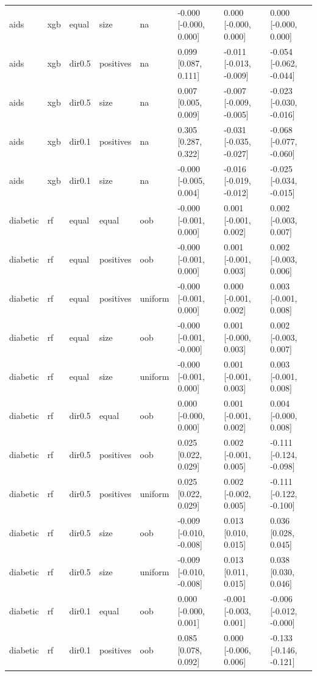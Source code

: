 \begin{tabular}{llllllll}
aids & xgb & equal & size & na & -0.000 [-0.000, 0.000] & 0.000 [-0.000, 0.000] & 0.000 [-0.000, 0.000] \\
aids & xgb & dir0.5 & positives & na & 0.099 [0.087, 0.111] & -0.011 [-0.013, -0.009] & -0.054 [-0.062, -0.044] \\
aids & xgb & dir0.5 & size & na & 0.007 [0.005, 0.009] & -0.007 [-0.009, -0.005] & -0.023 [-0.030, -0.016] \\
aids & xgb & dir0.1 & positives & na & 0.305 [0.287, 0.322] & -0.031 [-0.035, -0.027] & -0.068 [-0.077, -0.060] \\
aids & xgb & dir0.1 & size & na & -0.000 [-0.005, 0.004] & -0.016 [-0.019, -0.012] & -0.025 [-0.034, -0.015] \\
\addlinespace
diabetic & rf & equal & equal & oob & -0.000 [-0.001, 0.000] & 0.001 [-0.001, 0.002] & 0.002 [-0.003, 0.007] \\
diabetic & rf & equal & positives & oob & -0.000 [-0.001, 0.000] & 0.001 [-0.001, 0.003] & 0.002 [-0.003, 0.006] \\
diabetic & rf & equal & positives & uniform & -0.000 [-0.001, 0.000] & 0.000 [-0.001, 0.002] & 0.003 [-0.001, 0.008] \\
diabetic & rf & equal & size & oob & -0.000 [-0.001, -0.000] & 0.001 [-0.000, 0.003] & 0.002 [-0.003, 0.007] \\
diabetic & rf & equal & size & uniform & -0.000 [-0.001, 0.000] & 0.001 [-0.001, 0.003] & 0.003 [-0.001, 0.008] \\
diabetic & rf & dir0.5 & equal & oob & 0.000 [-0.000, 0.000] & 0.001 [-0.001, 0.002] & 0.004 [-0.000, 0.008] \\
diabetic & rf & dir0.5 & positives & oob & 0.025 [0.022, 0.029] & 0.002 [-0.001, 0.005] & -0.111 [-0.124, -0.098] \\
diabetic & rf & dir0.5 & positives & uniform & 0.025 [0.022, 0.029] & 0.002 [-0.002, 0.005] & -0.111 [-0.122, -0.100] \\
diabetic & rf & dir0.5 & size & oob & -0.009 [-0.010, -0.008] & 0.013 [0.010, 0.015] & 0.036 [0.028, 0.045] \\
diabetic & rf & dir0.5 & size & uniform & -0.009 [-0.010, -0.008] & 0.013 [0.011, 0.015] & 0.038 [0.030, 0.046] \\
diabetic & rf & dir0.1 & equal & oob & 0.000 [-0.000, 0.001] & -0.001 [-0.003, 0.001] & -0.006 [-0.012, -0.000] \\
diabetic & rf & dir0.1 & positives & oob & 0.085 [0.078, 0.092] & 0.000 [-0.006, 0.006] & -0.133 [-0.146, -0.121] \\

\end{tabular}
